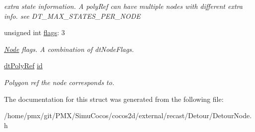 \begin{DoxyCompactItemize}
\begin{DoxyCompactList}\small\item\em extra state information. A poly\+Ref can have multiple nodes with different extra info. see D\+T\+\_\+\+M\+A\+X\+\_\+\+S\+T\+A\+T\+E\+S\+\_\+\+P\+E\+R\+\_\+\+N\+O\+DE \end{DoxyCompactList}\item 
\mbox{\label{structdtNode_acd018f188ced1765cce2d34ae88c9f75}} 
unsigned int \hyperlink{structdtNode_acd018f188ced1765cce2d34ae88c9f75}{flags}\+: 3
\begin{DoxyCompactList}\small\item\em \hyperlink{classNode}{Node} flags. A combination of dt\+Node\+Flags. \end{DoxyCompactList}\item 
\mbox{\label{structdtNode_a0ffc2be17daff1087e7d2920334eeb3d}} 
\hyperlink{group__detour_gab4e0b2257a670c1a800057999612b466}{dt\+Poly\+Ref} \hyperlink{structdtNode_a0ffc2be17daff1087e7d2920334eeb3d}{id}
\begin{DoxyCompactList}\small\item\em Polygon ref the node corresponds to. \end{DoxyCompactList}\end{DoxyCompactItemize}


The documentation for this struct was generated from the following file\+:\begin{DoxyCompactItemize}
\item 
/home/pmx/git/\+P\+M\+X/\+Simu\+Cocos/cocos2d/external/recast/\+Detour/Detour\+Node.\+h\end{DoxyCompactItemize}
